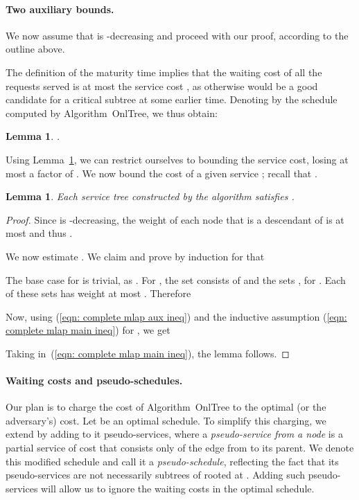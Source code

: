\documentclass[a4paper]{article}
\newtheorem{lemma}[theorem]{Lemma}
\newcommand{\OnAlgTreesGeneral}{{\sc OnlTree}}
\begin{document}
\paragraph{Two auxiliary bounds.}
We now assume that  is -decreasing and proceed with our
proof, according to the outline above.

The definition of the
maturity time implies that the waiting cost of all the requests
served is at most the service cost , as otherwise
 would be a good candidate for a critical subtree at some
earlier time. Denoting by  the schedule computed by
Algorithm~{\OnAlgTreesGeneral}, we thus obtain:


\begin{lemma}\label{lem: mlap, cost <= 2*service}
.
\end{lemma}

Using Lemma~\ref{lem: mlap, cost <= 2*service},
 we can restrict ourselves to bounding the service
cost, losing at most a factor of .  We now bound the cost of 
a given service ; recall that .


\begin{lemma}\label{l:complete}
Each service tree  constructed by the algorithm satisfies
.
\end{lemma}

\begin{proof}
Since  is -decreasing, the weight of each node that is a
descendant of  is at most  and thus
.

We now estimate . We claim and prove by induction for
 that

The base case for  is trivial, as . For , the set
 consists of  and the sets ,
for . Each of these sets  has
weight at most . Therefore

Now, using (\ref{eqn: complete mlap aux ineq}) and the
inductive assumption (\ref{eqn: complete mlap main ineq}) for ,
we get

Taking  in~(\ref{eqn: complete mlap main ineq}), the lemma follows.
\end{proof}


\paragraph{Waiting costs and pseudo-schedules.}

Our plan is to charge the cost of Algorithm~{\OnAlgTreesGeneral} to
the optimal (or the adversary's) cost. Let  be an optimal
schedule.  To simplify this charging, we extend  by adding
to it pseudo-services, where a \emph{pseudo-service from a node }
is a partial service of cost  that consists only of the
edge from  to its parent.  We denote this modified schedule
 and call it a \emph{pseudo-schedule}, reflecting the
fact that its pseudo-services are not necessarily subtrees of 
rooted at . Adding such pseudo-services will allow us to
ignore the waiting costs in the optimal schedule.
\end{document}
